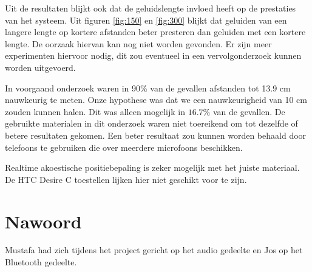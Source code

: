 \documentclass[12pt]{article}
\begin{document}
Uit de resultaten blijkt ook dat de geluidslengte invloed heeft op de prestaties van het systeem. Uit figuren \ref{fig:150} en \ref{fig:300} blijkt dat geluiden van een langere lengte op kortere afstanden beter presteren dan geluiden met een kortere lengte. De oorzaak hiervan kan nog niet worden gevonden. Er zijn meer experimenten hiervoor nodig, dit zou eventueel in een vervolgonderzoek kunnen worden uitgevoerd.

In voorgaand onderzoek \cite{qiu2011feasibility} waren in 90\% van de gevallen afstanden tot 13.9 cm nauwkeurig te meten. Onze hypothese was dat we een nauwkeurigheid van 10 cm zouden kunnen halen. Dit was alleen mogelijk in $16.7\%$ van de gevallen. De gebruikte materialen in dit onderzoek waren niet toereikend om tot dezelfde of betere resultaten gekomen. Een beter resultaat zou kunnen worden behaald door telefoons te gebruiken die over meerdere microfoons beschikken.

Realtime akoestische positiebepaling is zeker mogelijk met het juiste materiaal. De HTC Desire C toestellen lijken hier niet geschikt voor te zijn.

\section{Nawoord}
\label{sec:nawoord}
Mustafa had zich tijdens het project gericht op het audio gedeelte en Jos op het Bluetooth gedeelte.



\end{document}
